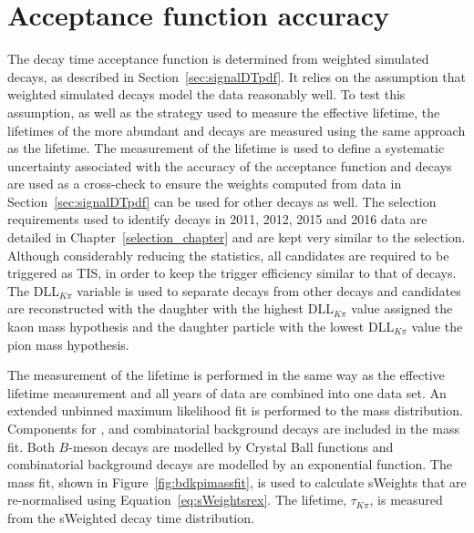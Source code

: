 \section{Acceptance function accuracy}
\label{sec:accptsyst}
The decay time acceptance function is determined from weighted simulated decays, as described in Section~\ref{sec:signalDTpdf}. It relies on the assumption that weighted simulated decays model the data reasonably well. To test this assumption, as well as the strategy used to measure the \bsmumu effective lifetime, the lifetimes of the more abundant \bdkpi and \bskk decays are measured using the same approach as the \bsmumu lifetime.
The measurement of the \bdkpi lifetime is used to define a systematic uncertainty associated with the accuracy of the acceptance function and \bskk decays are used as a cross-check to ensure the weights computed from \bdkpi data in Section~\ref{sec:signalDTpdf} can be used for other decays as well.
The selection requirements used to identify \bdkpi decays in 2011, 2012, 2015 and 2016 data are detailed in Chapter~\ref{selection_chapter} and are kept very similar to the \bsmumu selection. Although considerably reducing the statistics, all candidates are required to be triggered as TIS, in order to keep the \bhh trigger efficiency similar to that of \bsmumu decays. %
The DLL$_{K\pi}$ variable is used to separate \bdkpi decays from other \bhh decays and candidates are reconstructed with the daughter with the highest DLL$_{K\pi}$ value assigned the kaon mass hypothesis and the daughter particle with the lowest DLL$_{K\pi}$ value the pion mass hypothesis.

The measurement of the \bdki lifetime is performed in the same way as the \bsmumu effective lifetime measurement and all years of data are combined into one data set. An extended unbinned maximum likelihood fit is performed to the \bdkpi mass distribution. Components for \bdkpi, \bskpi and combinatorial background decays are included in the mass fit. Both $B$-meson decays are modelled by Crystal Ball functions and combinatorial background decays are modelled by an exponential function. The mass fit, shown in Figure~\ref{fig:bdkpimassfit}, is used to calculate sWeights that are re-normalised using Equation~\ref{eq:sWeightsrex}. The lifetime, $\tau_{K\pi}$, is  measured from the sWeighted decay time distribution. 

